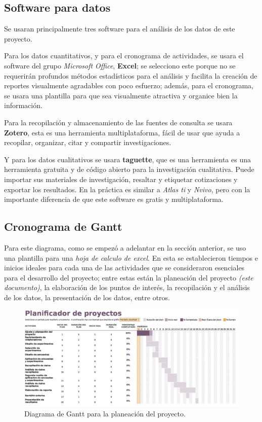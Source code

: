 \documentclass[12pt]{article}
\begin{document}
	\subsection {Software para datos}
		\par Se usaran principalmente tres software para el análisis de los datos de este proyecto.
		\par Para los datos cuantitativos, y para el cronograma de actividades, se usara el software del grupo \textit{Microsoft Office}, \textbf{Excel}; se selecciono este porque no se requerirán profundos métodos estadísticos para el análisis y facilita la creación de reportes visualmente agradables con poco esfuerzo; además, para el cronograma, se usara una plantilla para que sea visualmente atractiva y organice bien la información.
		\par Para la recopilación y almacenamiento de las fuentes de consulta se usara \textbf{Zotero}, esta es una herramienta multiplataforma, fácil de usar que ayuda a recopilar, organizar, citar y compartir investigaciones.
		\par Y para los datos cualitativos se usara \textbf{taguette}, que es una herramienta es una herramienta gratuita y de código abierto para la investigación cualitativa. Puede importar sus materiales de investigación, resaltar y etiquetar cotizaciones y exportar los resultados. En la práctica es similar a \textit{Atlas ti} y \textit{Nvivo}, pero con la importante diferencia de que este software es gratis y multiplataforma. 
		
	
	\subsection {Cronograma de Gantt}
	
		\par Para este diagrama, como se empezó a adelantar en la sección anterior, se uso una plantilla \cite{plantilla} para una \textit{hoja de calculo de excel}. En esta se establecieron tiempos e inicios ideales para cada una de las actividades que se consideraron esenciales para el desarrollo del proyecto; entre estas están la planeación del proyecto \textit{(este documento)}, la elaboración de los puntos de interés, la recopilación y el análisis de los datos, la presentación de los datos, entre otros.
		
		\begin{figure}[h]
			\centering
			\includegraphics[width=\textwidth]{grant.jpg}
			\caption{Diagrama de Gantt para la planeación del proyecto.}
			\label{gantt}
		\end{figure}
		
\end{document}

